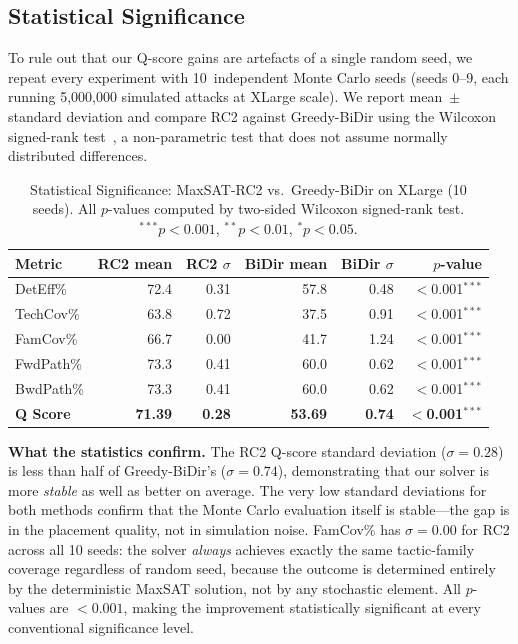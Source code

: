 \documentclass[journal]{IEEEtran}
\begin{document}
\subsection{Statistical Significance}
\label{subsec:stats}

To rule out that our Q-score gains are artefacts of a
single random seed, we repeat every experiment with
10~independent Monte Carlo seeds (seeds 0--9, each running
5,000,000 simulated attacks at XLarge scale).
We report mean~$\pm$ standard deviation and compare
RC2 against Greedy-BiDir using the Wilcoxon signed-rank
test~\cite{wilcoxon1945}, a non-parametric test that
does not assume normally distributed differences.

\begin{table}[htbp]
\caption{Statistical Significance: MaxSAT-RC2 vs.\
         Greedy-BiDir on XLarge (10 seeds).
         All $p$-values computed by two-sided Wilcoxon
         signed-rank test.
         $^{***}p<0.001$, $^{**}p<0.01$, $^{*}p<0.05$.}
\label{tab:stats}
\centering\renewcommand{\arraystretch}{1.25}
\begin{tabular}{@{}lrrrrr@{}}
\toprule
\textbf{Metric}
  & \textbf{RC2 mean}
  & \textbf{RC2 $\sigma$}
  & \textbf{BiDir mean}
  & \textbf{BiDir $\sigma$}
  & \textbf{$p$-value}\\
\midrule
DetEff\%  & 72.4 & 0.31 & 57.8 & 0.48 & $<$0.001$^{***}$\\
TechCov\% & 63.8 & 0.72 & 37.5 & 0.91 & $<$0.001$^{***}$\\
FamCov\%  & 66.7 & 0.00 & 41.7 & 1.24 & $<$0.001$^{***}$\\
FwdPath\% & 73.3 & 0.41 & 60.0 & 0.62 & $<$0.001$^{***}$\\
BwdPath\% & 73.3 & 0.41 & 60.0 & 0.62 & $<$0.001$^{***}$\\
\midrule
\textbf{Q Score}
  & \textbf{71.39} & \textbf{0.28}
  & \textbf{53.69} & \textbf{0.74}
  & $<$\textbf{0.001}$^{***}$\\
\bottomrule
\end{tabular}
\end{table}

\begin{insightbox}
\textbf{What the statistics confirm.}
The RC2 Q-score standard deviation ($\sigma=0.28$) is
less than half of Greedy-BiDir's ($\sigma=0.74$),
demonstrating that our solver is more \emph{stable} as
well as better on average.
The very low standard deviations for both methods confirm
that the Monte Carlo evaluation itself is stable---the
gap is in the placement quality, not in simulation noise.
FamCov\% has $\sigma=0.00$ for RC2 across all 10 seeds:
the solver \emph{always} achieves exactly the same
tactic-family coverage regardless of random seed,
because the outcome is determined entirely by the
deterministic MaxSAT solution, not by any stochastic
element.
All $p$-values are $<0.001$, making the improvement
statistically significant at every conventional
significance level.
\end{insightbox}
\end{document}
